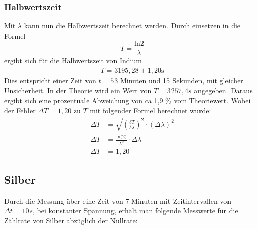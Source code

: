 \subsubsection{Halbwertszeit}
\label{sec:IH}

Mit $\lambda$ kann nun die Halbwertszeit berechnet werden.
Durch einsetzen in die Formel 
\begin{equation}
  T = \frac{\text{ln}2}{\lambda}
  \label{eqn:glTot}
\end{equation}
ergibt sich für die Halbwertszeit von Indium 
\begin{align*}
  T = 3195,28 \pm 1,20 \text{s}
\end{align*}
Dies entspricht einer Zeit von $t = 53$ Minuten und 15 Sekunden, mit gleicher Unsicherheit.
In der Theorie wird ein Wert von $T = 3257,4 s$ \cite{Periode} angegeben.
Daraus ergibt sich eine prozentuale Abweichung von ca 1,9 \% vom Theoriewert.
Wobei der Fehler $\Delta T = 1,20$ zu $T$ mit folgender Formel berechnet wurde:
\begin{align*}
  \Delta T &= \sqrt{\left(\frac{\delta T}{\delta \lambda}\right)^2 \cdot \left(\Delta \lambda\right)^2} \\
  \Delta T &= \frac{\text{ln(2)}}{\lambda^2} \cdot \Delta \lambda \\
  \Delta T &= 1,20
\end{align*}

\subsection{Silber}
\label{sec:silber}

Durch die Messung über eine Zeit von 7 Minuten mit Zeitintervallen von $\Delta t = 10s$, bei konstanter Spannung, erhält man folgende Messwerte für die Zählrate von Silber abzüglich der Nullrate:

